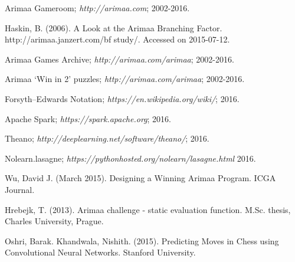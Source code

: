 \documentclass{article}
\begin{document}
\begin{thebibliography}{9}

Arimaa Gameroom;
\textit{http://arimaa.com};
2002-2016.

Haskin, B. (2006). A Look at the Arimaa Branching Factor. http://arimaa.janzert.com/bf study/. Accessed on 2015-07-12.

Arimaa Games Archive;
\textit{http://arimaa.com/arimaa};
2002-2016.

Arimaa `Win in 2' puzzles;
\textit{http://arimaa.com/arimaa};
2002-2016.

Forsyth--Edwards Notation;
\textit{https://en.wikipedia.org/wiki/};
2016.

Apache Spark;
\textit{https://spark.apache.org};
2016.

Theano;
\textit{http://deeplearning.net/software/theano/};
2016.

Nolearn.lasagne;
\textit{https://pythonhosted.org/nolearn/lasagne.html}
2016.

Wu, David J. (March 2015).
Designing a Winning Arimaa Program.
ICGA Journal.

Hrebejk, T. (2013). Arimaa challenge - static evaluation function. M.Sc. thesis, Charles University, Prague.

Oshri, Barak. Khandwala, Nishith. (2015).  Predicting Moves in Chess using Convolutional Neural Networks.  Stanford University.

\end{thebibliography}
\end{document}
